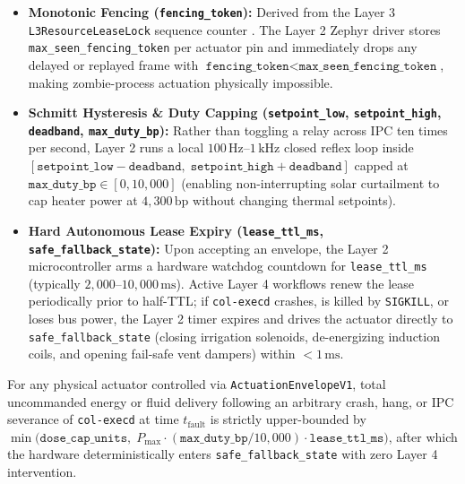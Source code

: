 \begin{itemize}
    \item \textbf{Monotonic Fencing (\texttt{fencing\_token}):} Derived from the Layer 3
    \texttt{L3ResourceLeaseLock} sequence counter \parencite{kleppmann2017designing}. The Layer 2
    Zephyr driver stores \texttt{max\_seen\_fencing\_token} per actuator pin and immediately drops
    any delayed or replayed frame with $\texttt{fencing\_token} < \texttt{max\_seen\_fencing\_token}$,
    making zombie-process actuation physically impossible.
    \item \textbf{Schmitt Hysteresis \& Duty Capping (\texttt{setpoint\_low}, \texttt{setpoint\_high},
    \texttt{deadband}, \texttt{max\_duty\_bp}):} Rather than toggling a relay across IPC ten
    times per second, Layer 2 runs a local $100\,\mathrm{Hz}\text{--}1\,\mathrm{kHz}$ closed
    reflex loop inside $[\texttt{setpoint\_low} - \texttt{deadband},\; \texttt{setpoint\_high} +
    \texttt{deadband}]$ capped at $\texttt{max\_duty\_bp} \in [0, 10{,}000]$ (enabling non-interrupting
    solar curtailment to cap heater power at $4{,}300\,\mathrm{bp}$ without changing thermal
    setpoints).
    \item \textbf{Hard Autonomous Lease Expiry (\texttt{lease\_ttl\_ms}, \texttt{safe\_fallback\_state}):}
    Upon accepting an envelope, the Layer 2 microcontroller arms a hardware watchdog countdown for
    \texttt{lease\_ttl\_ms} (typically $2{,}000\text{--}10{,}000\,\mathrm{ms}$). Active Layer 4
    workflows renew the lease periodically prior to half-TTL; if \texttt{col-execd} crashes, is
    killed by \texttt{SIGKILL}, or loses bus power, the Layer 2 timer expires and drives the
    actuator directly to \texttt{safe\_fallback\_state} (closing irrigation solenoids, de-energizing
    induction coils, and opening fail-safe vent dampers) within $< 1\,\mathrm{ms}$.
\end{itemize}

\begin{invariant}
\label{inv:l2-safe-parking}
For any physical actuator controlled via \texttt{ActuationEnvelopeV1}, total uncommanded energy
or fluid delivery following an arbitrary crash, hang, or IPC severance of \texttt{col-execd} at
time $t_{\mathrm{fault}}$ is strictly upper-bounded by $\min\bigl(\texttt{dose\_cap\_units},\;
P_{\max} \cdot (\texttt{max\_duty\_bp}/10{,}000) \cdot \texttt{lease\_ttl\_ms}\bigr)$, after
which the hardware deterministically enters \texttt{safe\_fallback\_state} with zero Layer 4
intervention.
\end{invariant}


